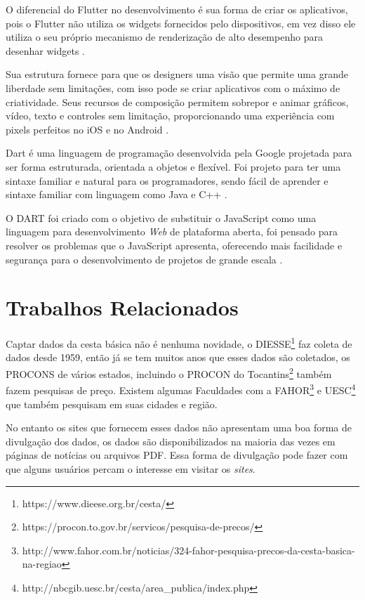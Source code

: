 \documentclass{ifto-tex}
\begin{document}
O diferencial do Flutter no desenvolvimento é sua forma de criar os aplicativos, pois o Flutter não utiliza os widgets fornecidos pelo dispositivos, em vez disso ele utiliza o seu próprio mecanismo de renderização de alto desempenho para desenhar widgets \cite{corazza2018aplicativo}.

Sua estrutura fornece para que os designers uma visão que permite uma grande liberdade sem limitações, com isso pode se criar aplicativos com o máximo de criatividade. Seus recursos de composição permitem sobrepor e animar gráficos, vídeo, texto e controles sem limitação, proporcionando uma experiência com pixels perfeitos no iOS e no Android \cite{flutterf54:online}.

Dart é uma linguagem de programação desenvolvida pela Google projetada para ser forma estruturada, orientada a objetos e flexível. Foi projeto para ter uma sintaxe familiar e natural para os programadores, sendo fácil de aprender e sintaxe familiar com linguagem como Java e C++ \cite{DartNova22:online}.



O DART foi criado com o objetivo de substituir o JavaScript como uma linguagem para desenvolvimento \textit{Web} de plataforma aberta, foi pensado para resolver os problemas que o JavaScript apresenta, oferecendo mais facilidade e segurança para o desenvolvimento de projetos de grande escala \cite{Linguage47:online}.


\section{Trabalhos Relacionados}
Captar dados da cesta básica não é nenhuma novidade, o DIESSE\footnote{https://www.dieese.org.br/cesta/} faz coleta de dados desde 1959, então já se tem muitos anos que esses dados são coletados, os PROCONS de vários estados, incluindo o PROCON do Tocantins\footnote{https://procon.to.gov.br/servicos/pesquisa-de-precos/} também fazem pesquisas de preço. Existem algumas Faculdades com a FAHOR\footnote{http://www.fahor.com.br/noticias/324-fahor-pesquisa-precos-da-cesta-basica-na-regiao} e UESC\footnote{http://nbcgib.uesc.br/cesta/area\_publica/index.php} que também pesquisam em suas cidades e região.

No entanto os sites que fornecem esses dados não apresentam uma boa forma de divulgação dos dados, os dados são disponibilizados na maioria das vezes em páginas de notícias  ou arquivos PDF. Essa forma de divulgação pode fazer com que alguns usuários percam o interesse em visitar os \textit{sites}.
\end{document}
